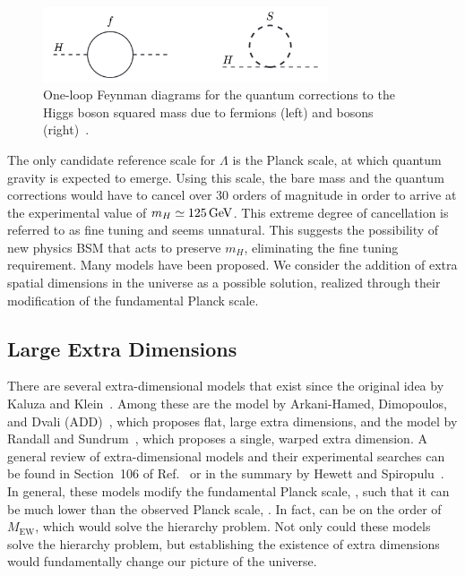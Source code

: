 \begin{figure}[!htb]
	\centering
	\includegraphics[width=0.75\textwidth]{figures/higgs_corrections.png}
	\caption{One-loop Feynman diagrams for the quantum corrections to the Higgs boson squared mass due to fermions (left) and bosons (right)~\cite{Martin:1997ns}.}
	\label{fig:higgs_corrections}
\end{figure}

The only candidate reference scale for $\Lambda$ is the Planck scale, at which quantum gravity is expected to emerge. Using this scale, the bare mass and the quantum corrections would have to cancel over 30 orders of magnitude in order to arrive at the experimental value of $m_H \simeq 125\,\text{Ge\hspace{-.08em}V}$. This extreme degree of cancellation is referred to as fine tuning and seems unnatural. This suggests the possibility of new physics BSM that acts to preserve $m_H$, eliminating the fine tuning requirement. Many models have been proposed. We consider the addition of extra spatial dimensions in the universe as a possible solution, realized through their modification of the fundamental Planck scale.


\subsection{Large Extra Dimensions}

There are several extra-dimensional models that exist since the original idea by Kaluza and Klein~\cite{Kaluza:1921tu,Klein:1926fj,Klein:1926tv}. Among these are the model by Arkani-Hamed, Dimopoulos, and Dvali (ADD)~\cite{ArkaniHamed:1998rs,Antoniadis:1998ig,ArkaniHamed:1998nn}, which proposes flat, large extra dimensions, and the model by Randall and Sundrum~\cite{Randall:1999ee,Randall:1999vf}, which proposes a single, warped extra dimension. A general review of extra-dimensional models and their experimental searches can be found in Section~106 of Ref.~\cite{Tanabashi:2018oca} or in the summary by Hewett and Spiropulu~\cite{Hewett:2002hv}. In general, these models modify the fundamental Planck scale, \MD, such that it can be much lower than the observed Planck scale, \Mpl. In fact, \MD can be on the order of $M_{\mathrm{EW}}$, which would solve the hierarchy problem. Not only could these models solve the hierarchy problem, but establishing the existence of extra dimensions would fundamentally change our picture of the universe.

